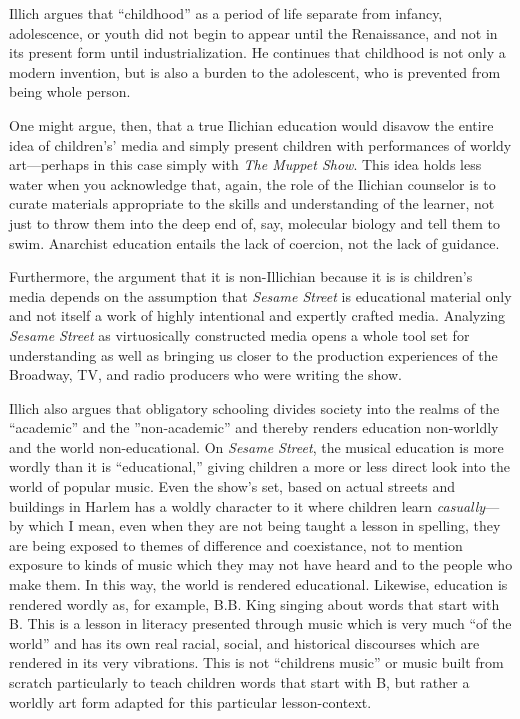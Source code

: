 \documentclass[12pt,letterpaper]{article}
\newcommand{\ses}{\textit{Sesame Street }}
\begin{document}
	Illich argues that ``childhood'' as a period of life separate from 
	infancy, adolescence, or youth did not begin to appear until the 
	Renaissance, and not in its present form until industrialization.
	\autocite[13]{Illich} He continues that childhood is not only a modern
	invention, but is also a burden to the adolescent, who is prevented 
	from being whole person.\autocite[14]{Illich}

	One might argue, then, that a true Ilichian education would disavow the
	entire idea of children's' media and simply present children with 
	performances of worldy art---perhaps in this case simply with 
	\textit{The Muppet Show}. This idea holds less water when you 
	acknowledge that, again, the role of the Ilichian counselor is to curate
	materials appropriate to the skills and understanding of the learner, 
	not just to throw them into the deep end of, say, molecular biology 
	and tell them to swim. Anarchist education entails the lack of coercion,
	not the lack of guidance. 

	Furthermore, the argument that it is non-Illichian because it is
	is children's media depends on the assumption that \ses is educational
	material only and not itself a work of highly intentional and expertly
	crafted media. Analyzing \ses as virtuosically constructed media opens a
	whole tool set for understanding as well
	as bringing us closer to the production experiences of the Broadway, TV,
	and radio producers who were writing the show.  

	Illich also argues that obligatory schooling divides society into the 
	realms of the ``academic'' and the ''non-academic'' and thereby renders
	education non-worldly and the world non-educational.\autocite[12]
	{Illich} On \textit{Sesame Street}, the musical education is more wordly
	than it is ``educational,'' giving children a more or less direct look 
	into the world of popular music. Even the show's set, based on actual
	streets and buildings in Harlem\autocite[154]{Davis} has a
	 woldly character to it where children learn \textit{casually}---by 
	which I mean, even when they are not being taught a lesson in spelling,
	they are being exposed to themes of difference and coexistance, not to 
	mention exposure to kinds of music which they may not have heard 
	and to the people who make them. In this way, the world is rendered 
	educational. Likewise, 
	education is rendered wordly as, for example, B.B. King singing about 
	words that start with B. This is a lesson in literacy presented through
	music which is very much ``of the world'' and has its own real racial, 
	social, and historical discourses which are rendered in its very 
	vibrations. This is not ``childrens music'' or music built from scratch
	particularly to teach children words that start with B, but rather a 
	worldly art form adapted for this particular lesson-context.
\end{document}
